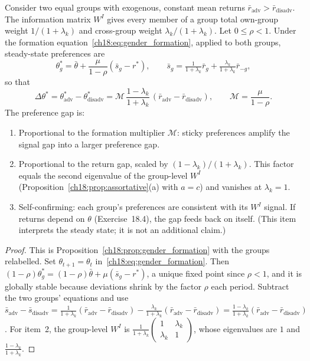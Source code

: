 \documentclass[../structural_economics_book.tex]{subfiles}
\begin{document}
\begin{proposition}\label{ch18:thm:attribute_trap}
Consider two equal groups with exogenous, constant mean returns $\bar r_{\text{adv}} > \bar r_{\text{disadv}}$. The information matrix $W^I$ gives every member of a group total own-group weight $1/(1+\lambda_k)$ and cross-group weight $\lambda_k/(1+\lambda_k)$. Let $0 \le \rho < 1$. Under the formation equation~\eqref{ch18:eq:gender_formation}, applied to both groups, steady-state preferences are
\begin{equation}\label{ch18:eq:attribute_formation}
\theta^*_g = \bar{\theta} + \frac{\mu}{1-\rho}\left(\bar{s}_g - r^*\right), \qquad \bar s_g = \tfrac{1}{1+\lambda_k}\bar r_g + \tfrac{\lambda_k}{1+\lambda_k}\bar r_{-g},
\end{equation}
so that
\[
\Delta\theta^* = \theta^*_{\text{adv}} - \theta^*_{\text{disadv}} = \mathcal{M}\,\frac{1-\lambda_k}{1+\lambda_k}\,(\bar r_{\text{adv}} - \bar r_{\text{disadv}}), \qquad \mathcal{M} = \frac{\mu}{1-\rho}.
\]
The preference gap is:
\begin{enumerate}
\item Proportional to the formation multiplier $\mathcal{M}$: sticky preferences amplify the signal gap into a larger preference gap.
\item Proportional to the return gap, scaled by $(1-\lambda_k)/(1+\lambda_k)$. This factor equals the second eigenvalue of the group-level $W^I$ (Proposition~\ref{ch18:prop:assortative}(a) with $a=c$) and vanishes at $\lambda_k = 1$.
\item Self-confirming: each group's preferences are consistent with its $W^I$ signal. If returns depend on $\theta$ (Exercise~18.4), the gap feeds back on itself. (This item interprets the steady state; it is not an additional claim.)
\end{enumerate}
\end{proposition}

\begin{proof}
This is Proposition~\ref{ch18:prop:gender_formation} with the groups relabelled. Set $\theta_{t+1} = \theta_t$ in~\eqref{ch18:eq:gender_formation}. Then $(1-\rho)\theta^*_g = (1-\rho)\bar\theta + \mu(\bar s_g - r^*)$, a unique fixed point since $\rho < 1$, and it is globally stable because deviations shrink by the factor $\rho$ each period. Subtract the two groups' equations and use $\bar s_{\text{adv}} - \bar s_{\text{disadv}} = \frac{1}{1+\lambda_k}(\bar r_{\text{adv}} - \bar r_{\text{disadv}}) - \frac{\lambda_k}{1+\lambda_k}(\bar r_{\text{adv}} - \bar r_{\text{disadv}}) = \frac{1-\lambda_k}{1+\lambda_k}(\bar r_{\text{adv}} - \bar r_{\text{disadv}})$. For item~2, the group-level $W^I$ is $\frac{1}{1+\lambda_k}\begin{pmatrix}1 & \lambda_k\\ \lambda_k & 1\end{pmatrix}$, whose eigenvalues are $1$ and $\frac{1-\lambda_k}{1+\lambda_k}$.
\end{proof}
\end{document}
